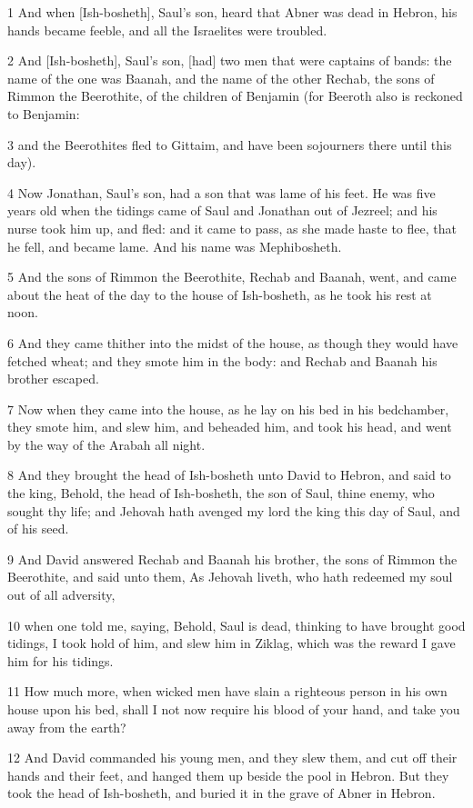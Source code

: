 \par 1 And when [Ish-bosheth], Saul's son, heard that Abner was dead in Hebron, his hands became feeble, and all the Israelites were troubled.
\par 2 And [Ish-bosheth], Saul's son, [had] two men that were captains of bands: the name of the one was Baanah, and the name of the other Rechab, the sons of Rimmon the Beerothite, of the children of Benjamin (for Beeroth also is reckoned to Benjamin:
\par 3 and the Beerothites fled to Gittaim, and have been sojourners there until this day).
\par 4 Now Jonathan, Saul's son, had a son that was lame of his feet. He was five years old when the tidings came of Saul and Jonathan out of Jezreel; and his nurse took him up, and fled: and it came to pass, as she made haste to flee, that he fell, and became lame. And his name was Mephibosheth.
\par 5 And the sons of Rimmon the Beerothite, Rechab and Baanah, went, and came about the heat of the day to the house of Ish-bosheth, as he took his rest at noon.
\par 6 And they came thither into the midst of the house, as though they would have fetched wheat; and they smote him in the body: and Rechab and Baanah his brother escaped.
\par 7 Now when they came into the house, as he lay on his bed in his bedchamber, they smote him, and slew him, and beheaded him, and took his head, and went by the way of the Arabah all night.
\par 8 And they brought the head of Ish-bosheth unto David to Hebron, and said to the king, Behold, the head of Ish-bosheth, the son of Saul, thine enemy, who sought thy life; and Jehovah hath avenged my lord the king this day of Saul, and of his seed.
\par 9 And David answered Rechab and Baanah his brother, the sons of Rimmon the Beerothite, and said unto them, As Jehovah liveth, who hath redeemed my soul out of all adversity,
\par 10 when one told me, saying, Behold, Saul is dead, thinking to have brought good tidings, I took hold of him, and slew him in Ziklag, which was the reward I gave him for his tidings.
\par 11 How much more, when wicked men have slain a righteous person in his own house upon his bed, shall I not now require his blood of your hand, and take you away from the earth?
\par 12 And David commanded his young men, and they slew them, and cut off their hands and their feet, and hanged them up beside the pool in Hebron. But they took the head of Ish-bosheth, and buried it in the grave of Abner in Hebron.

